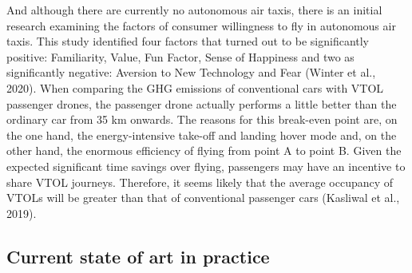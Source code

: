 \documentclass[
]{book}
\begin{document}
And although there are currently no autonomous air taxis, there is an initial research examining the factors of consumer willingness to fly in autonomous air taxis. This study identified four factors that turned out to be significantly positive: Familiarity, Value, Fun Factor, Sense of Happiness and two as significantly negative: Aversion to New Technology and Fear (Winter et al., 2020).
When comparing the GHG emissions of conventional cars with VTOL passenger drones, the passenger drone actually performs a little better than the ordinary car from 35 km onwards. The reasons for this break-even point are, on the one hand, the energy-intensive take-off and landing hover mode and, on the other hand, the enormous efficiency of flying from point A to point B. Given the expected significant time savings over flying, passengers may have an incentive to share VTOL journeys. Therefore, it seems likely that the average occupancy of VTOLs will be greater than that of conventional passenger cars (Kasliwal et al., 2019).

\hypertarget{current-state-of-art-in-practice-39}{%
\subsection*{Current state of art in practice}\label{current-state-of-art-in-practice-39}}
\end{document}
